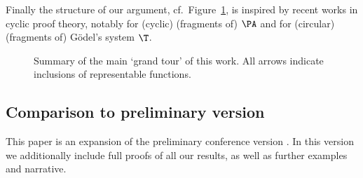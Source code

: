 Finally the structure of our argument, cf.~Figure~\ref{fig:grand-tour}, is inspired by recent works in cyclic proof theory, notably \cite{Simpson17:cyc-arith,Das20:ca-log-comp} for (cyclic) (fragments of) $\PA$ and \cite{Das21:CT-preprint,Das21:CT-fscd,KuperbergPP21systemT} for (circular) (fragments of) G\"odel's system $\T$.


\begin{figure}
    \caption{Summary of the main `grand tour' of this work. All arrows indicate inclusions of representable functions.
    }
    \label{fig:grand-tour}
\end{figure}

\subsection{Comparison to preliminary version}
This paper is an expansion of the preliminary conference version \cite{CD23:muLJ-lics}.
In this version we additionally include full proofs of all our results, as well as further examples and narrative. 

